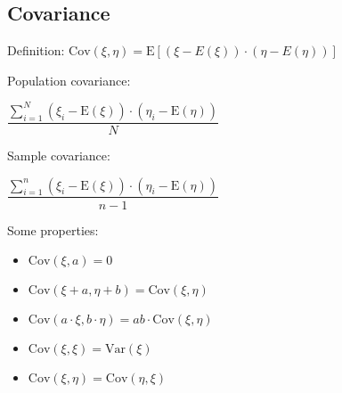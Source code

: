 \documentclass[10pt, a4paper, landscape]{extarticle}
\newcommand{\E}{\mathrm{E}}
\newcommand{\Var}{\mathrm{Var}}
\newcommand{\Cov}{\mathrm{Cov}}
\begin{document}
\begin{multicols}{3}
	\subsection*{Covariance}
	Definition: \quad $\Cov(\xi, \eta) = \E[(\xi - E(\xi)) \cdot (\eta - E(\eta))]$
	\begin{multicols}{2}
		Population covariance:
		\begin{center}
			$\dfrac{\sum_{i=1}^{N} (\xi_i - \E(\xi)) \cdot (\eta_i - \E(\eta))}{N}$
		\end{center}
		\columnbreak
		Sample covariance:
		\begin{center}
			$\dfrac{\sum_{i=1}^{n} (\xi_i - \E(\xi)) \cdot (\eta_i - \E(\eta))}{n-1}$
		\end{center}
	\end{multicols}
	Some properties:
	\begin{itemize}[leftmargin=*]
		\item $\Cov(\xi, a) = 0$
		\item $\Cov(\xi + a, \eta + b) = \Cov(\xi, \eta)$
		\item $\Cov(a \cdot \xi, b \cdot \eta) = a b \cdot \Cov(\xi, \eta)$
		\item $\Cov(\xi, \xi) = \Var(\xi)$
		\item $\Cov(\xi, \eta) = \Cov(\eta, \xi)$
	\end{itemize}
\end{multicols}
\pagebreak
\end{document}
